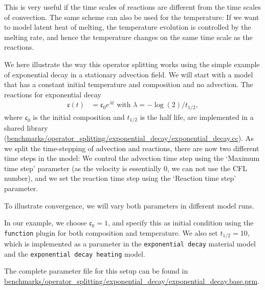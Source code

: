 \documentclass{article}
\begin{document}
This is very useful if the time scales of reactions are different from the time scales of convection. 
The same scheme can also be used for the temperature: If we want to model latent heat of melting, the temperature evolution is controlled by the melting rate, and hence the temperature changes on the same time scale as the reactions. 

We here illustrate the way this operator splitting works using the simple example of exponential decay in a stationary advection field. We will start with a model that has a constant initial temperature and composition and no advection. The reactions for exponential decay 
\begin{align}
  \mathfrak{c}(t) 
  &=
  \mathfrak{c}_0 e^{\lambda t} \text{ with } \lambda = - \log(2)/t_{1/2}, 
\end{align}
where $\mathfrak{c}_0$ is the initial composition and $t_{1/2}$ is the half life, are implemented in a shared library
(\url{benchmarks/operator_splitting/exponential_decay/exponential_decay.cc}). 
As we split the time-stepping of advection and reactions, there are now two different time steps in the model:
We control the advection time step using the `Maximum time step' parameter (as the velocity is essentially 0, 
we can not use the CFL number), and we set the reaction time step using the `Reaction time step' parameter. 

To illustrate convergence, we will vary both parameters in different model runs. 

In our example, we choose $\mathfrak{c}_0=1$, and specify this as initial condition using the \texttt{function} plugin for both composition and temperature. We also set $t_{1/2}=10$, which is implemented as a parameter in the \texttt{exponential decay} material model and the \texttt{exponential decay heating} model. 

The complete parameter file for this setup can be found in \url{benchmarks/operator_splitting/exponential_decay/exponential_decay.base.prm}.
\end{document}
